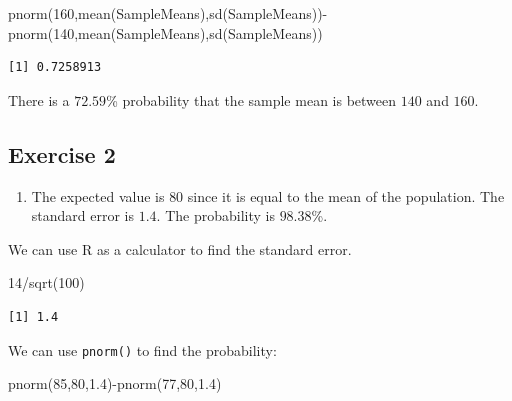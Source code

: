 \documentclass[
  letterpaper,
  DIV=11,
  numbers=noendperiod]{scrreprt}
\newenvironment{Shaded}{\begin{snugshade}}{\end{snugshade}}
\newcommand{\DecValTok}[1]{\textcolor[rgb]{0.68,0.00,0.00}{#1}}
\newcommand{\FloatTok}[1]{\textcolor[rgb]{0.68,0.00,0.00}{#1}}
\newcommand{\FunctionTok}[1]{\textcolor[rgb]{0.28,0.35,0.67}{#1}}
\newcommand{\NormalTok}[1]{\textcolor[rgb]{0.00,0.23,0.31}{#1}}
\newcommand{\SpecialCharTok}[1]{\textcolor[rgb]{0.37,0.37,0.37}{#1}}
\providecommand{\tightlist}{%
  \setlength{\itemsep}{0pt}\setlength{\parskip}{0pt}}\usepackage{longtable,booktabs,array}
\begin{document}
\begin{Shaded}
\begin{Highlighting}[numbers=left,,]
\FunctionTok{pnorm}\NormalTok{(}\DecValTok{160}\NormalTok{,}\FunctionTok{mean}\NormalTok{(SampleMeans),}\FunctionTok{sd}\NormalTok{(SampleMeans))}\SpecialCharTok{{-}}\FunctionTok{pnorm}\NormalTok{(}\DecValTok{140}\NormalTok{,}\FunctionTok{mean}\NormalTok{(SampleMeans),}\FunctionTok{sd}\NormalTok{(SampleMeans))}
\end{Highlighting}
\end{Shaded}

\begin{verbatim}
[1] 0.7258913
\end{verbatim}

There is a \(72.59\)\% probability that the sample mean is between
\(140\) and \(160\).

\hypertarget{exercise-2-21}{%
\subsection*{Exercise 2}\label{exercise-2-21}}

\begin{blackbox}

\begin{enumerate}
\def\labelenumi{\arabic{enumi}.}
\tightlist
\item
  The expected value is \(80\) since it is equal to the mean of the
  population. The standard error is \(1.4\). The probability is
  \(98.38\)\%.
\end{enumerate}

\end{blackbox}

We can use R as a calculator to find the standard error.

\begin{Shaded}
\begin{Highlighting}[numbers=left,,]
\DecValTok{14}\SpecialCharTok{/}\FunctionTok{sqrt}\NormalTok{(}\DecValTok{100}\NormalTok{)}
\end{Highlighting}
\end{Shaded}

\begin{verbatim}
[1] 1.4
\end{verbatim}

We can use \texttt{pnorm()} to find the probability:

\begin{Shaded}
\begin{Highlighting}[numbers=left,,]
\FunctionTok{pnorm}\NormalTok{(}\DecValTok{85}\NormalTok{,}\DecValTok{80}\NormalTok{,}\FloatTok{1.4}\NormalTok{)}\SpecialCharTok{{-}}\FunctionTok{pnorm}\NormalTok{(}\DecValTok{77}\NormalTok{,}\DecValTok{80}\NormalTok{,}\FloatTok{1.4}\NormalTok{)}
\end{Highlighting}
\end{Shaded}
\end{document}

